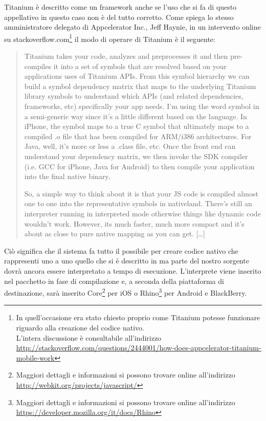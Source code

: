 			Titanium è descritto come un framework \crosscomp{}\citep{Web:peptechlearn.blogspot.it} anche se l'uso che si fa di 
			questo appellativo in questo caso non è del tutto corretto. Come 
			spiega lo stesso amministratore delegato di Appcelerator Inc., Jeff 
			Haynie, in un intervento online su 
			\mbox{stackoverflow.com}\footnote{In quell'occasione era stato 
			chiesto proprio come Titanium potesse funzionare riguardo alla 
			creazione del codice nativo.\\L'intera discussione è consultabile 
			all'indirizzo 
			\url{http://stackoverflow.com/questions/2444001/how-does-appcelerator-titanium-mobile-work}}
			il modo di operare di Titanium è il seguente:
			\begin{quotation}
				Titanium takes your \js{} code, analyzes and preprocesses 
				it and then pre-compiles it into a set of symbols that are 
				resolved based on your applications uses of Titanium APIs. From 
				this symbol hierarchy we can build a symbol dependency matrix 
				that maps to the underlying Titanium library symbols to 
				understand which APIs (and related dependencies, frameworks, 
				etc) specifically your app needs. I'm using the word symbol in a 
				semi-generic way since it's a little different based on the 
				language. In iPhone, the symbol maps to a true C symbol that 
				ultimately maps to a compiled .o file that has been compiled for 
				ARM/i386 architectures. For Java, well, it's more or less a 
				.class file, etc. Once the front end can understand your 
				dependency matrix, we then invoke the SDK compiler (i.e. GCC for 
				iPhone, Java for Android) to then compile your application into 
				the final native binary.
				
				So, a simple way to think about it is that your JS code is 
				compiled almost one to one into the representative symbols in 
				nativeland. There's still an interpreter running in interpreted 
				mode otherwise things like dynamic code wouldn't work. However, 
				its much faster, much more compact and it's about as close to 
				pure native mapping as you can get. [\ldots]
			\end{quotation}
			Ciò significa che il sistema fa tutto il possibile per creare codice 
			nativo che rappresenti uno a uno quello che si è descritto in 
			\js{} ma parte del nostro sorgente dovrà ancora essere 
			interpretato a tempo di esecuzione. L'interprete \js{} viene 
			inserito nel pacchetto in fase di compilazione e, a seconda della 
			piattaforma di destinazione, sarà inserito 
			\js{}Core\footnote{Maggiori dettagli e informazioni si possono 
			trovare online all'indirizzo\\ \url{http://webkit.org/projects/javascript/}} 
			per iOS o Rhino\footnote{Maggiori dettagli e informazioni si possono trovare 
			online all'indirizzo\\ \url{https://developer.mozilla.org/it/docs/Rhino}} 
			per Android e BlackBerry\citep{Web:KevinPost}.
			
